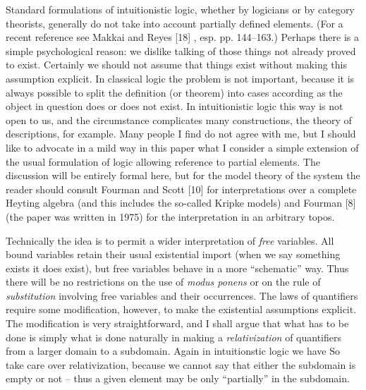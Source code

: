 \maketitle

Standard formulations of intuitionistic logic, whether by logicians or by category theorists, generally do not take into account partially defined elements. (For a recent reference see Makkai and Reyes [18] , esp. pp. 144--163.) Perhaps
there is a simple psychological reason: we dislike talking of those things not
already proved to exist. Certainly we should not assume that things exist without making this assumption explicit. In classical logic the problem is not important, because it is always possible to split the definition (or theorem) into cases according as the object in question does or does not exist. In intuitionistic logic this way is not open to us, and the circumstance complicates many constructions, the
theory of descriptions, for example. Many people I find do not agree with me, but
I should like to advocate in a mild way in this paper what I consider a simple extension of the usual formulation of logic allowing reference to partial elements. The discussion will be entirely formal here, but for the model theory of the system the reader should consult Fourman and Scott [10] for interpretations over a complete Heyting algebra (and this includes the so-called Kripke models) and Fourman [8]
(the paper was written in 1975) for the interpretation in an arbitrary topos.

Technically the idea is to permit a wider interpretation of {\it free} variables.
All bound variables retain their usual existential import (when we say something exists it does exist), but free variables behave in a more ``schematic'' way. Thus there will be no restrictions on the use of {\it modus ponens} or on the rule of {\it substitution} involving free variables and their occurrences. The laws of quantifiers require some modification, however, to make the existential assumptions explicit. The modification is very straightforward, and I shall argue that what has to be done is
simply what is done naturally in making a {\it relativization} of quantifiers from a
larger domain to a subdomain. Again in intuitionstic logic we have So take care over relativization, because we cannot say that either the subdomain is empty or not -- thus a given element may be only ``partially'' in the subdomain.

